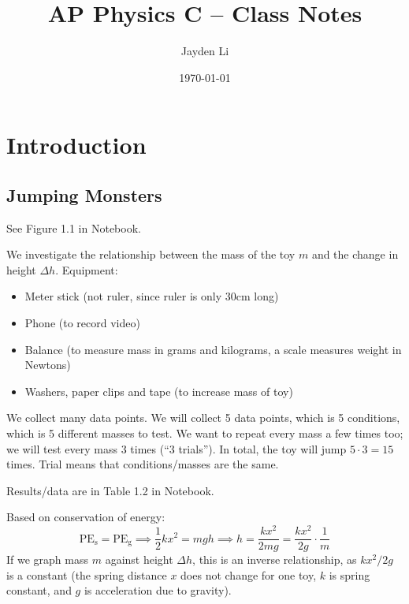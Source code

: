 \documentclass{article}
\title{\vspace*{-40pt}AP Physics C -- Class Notes}
\author{Jayden Li}
\date{\today}
\begin{document}
\fontsize{11pt}{12pt}\selectfont
\setlength{\abovedisplayskip}{\abovedisplayskip/2}
\setlength{\belowdisplayskip}{\belowdisplayskip/2}
\setlength{\parindent}{0pt}
\setlength{\parskip}{2ex plus 0.5ex minus 0.2ex}
\maketitle

\tableofcontents

\section{Introduction}

\subsection{Jumping Monsters}

See Figure 1.1 in Notebook.

We investigate the relationship between the mass of the toy $m$ and the change in height $\Delta h$. Equipment:
\begin{itemize}
	\item Meter stick (not ruler, since ruler is only 30cm long)
	\item Phone (to record video)
	\item Balance (to measure mass in grams and kilograms, a scale measures weight in Newtons)
	\item Washers, paper clips and tape (to increase mass of toy)
\end{itemize}

We collect many data points. We will collect 5 data points, which is 5 conditions, which is 5 different masses to test.  We want to repeat every mass a few times too; we will test every mass 3 times (``3 trials''). In total, the toy will jump $5\cdot 3=15$ times. Trial means that conditions/masses are the same.

Results/data are in Table 1.2 in Notebook.

Based on conservation of energy:
\begin{equation*}
    \text{PE}_ \text{s}= \text{PE}_ \text{g}
	\implies \frac12kx^2=mgh
	\implies h=\frac{kx^2}{2mg}=\frac{kx^2}{2g}\cdot\frac1m
\end{equation*}
If we graph mass $m$ against height $\Delta h$, this is an inverse relationship, as $kx^2/2g$ is a constant (the spring distance $x$ does not change for one toy, $k$ is spring constant, and $g$ is acceleration due to gravity).
\end{document}
